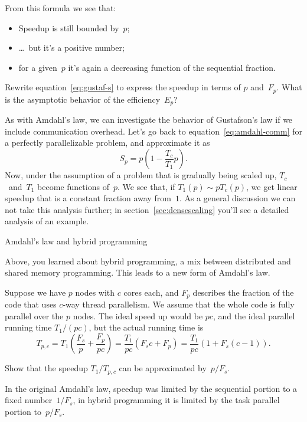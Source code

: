From this formula we see that:
\begin{itemize}
\item Speedup is still bounded by~$p$;
\item \ldots~but it's a positive number;
\item for a given~$p$ it's again a decreasing function of the sequential fraction.
\end{itemize}

\begin{exercise}
  \label{ex:gustaf-e}
  Rewrite equation~\eqref{eq:gustaf-s} to express the speedup in terms of $p$
  and~$F_p$. What is the asymptotic behavior of the efficiency~$E_p$?
\end{exercise}

As with Amdahl's law, we can investigate the behavior of Gustafson's
law if we include communication overhead. Let's go back to
equation~\eqref{eq:amdahl-comm} for a perfectly parallelizable
problem, and approximate it as
\[ S_p = p(1-\frac{T_c}{T_1}p). \]
Now, under the assumption of a problem that is gradually being scaled up,
$T_c$~and~$T_1$ become functions of~$p$.
We see that, if $T_1(p)\sim pT_c(p)$,
we get linear speedup that is a constant fraction away from~$1$.
As a general discussion we can not take this analysis further;
in section~\ref{sec:densescaling}
you'll see a detailed analysis of an example. 


 {Amdahl's law and hybrid programming}

Above, you learned about hybrid programming, a mix between distributed
and shared memory programming. This leads to a new form of Amdahl's
law.

Suppose we have $p$ nodes with $c$ cores each, and $F_p$ describes the fraction
of the code that uses $c$-way thread parallelism. We assume that the
whole code is fully parallel over the $p$ nodes.
The ideal speed up would be $p c$, and the ideal parallel running
time $T_1/(pc)$, but the actual running time is 
\[
  T_{p,c} = T_1 \left(\frac {F_s}{p} + \frac{F_p}{p c}\right)
  = \frac{T_1}{pc}\left( F_sc+F_p\right) 
  = \frac{T_1}{pc}\left( 1+ F_s(c-1)\right).
\]
\begin{exercise}
  Show that the speedup $T_1/T_{p,c}$ can be approximated by~$p/F_s$.
\end{exercise}
In the original Amdahl's law, speedup was limited by the sequential
portion to a fixed number~$1/F_s$, in hybrid programming it is limited
by the task parallel portion to~$p/F_s$.


